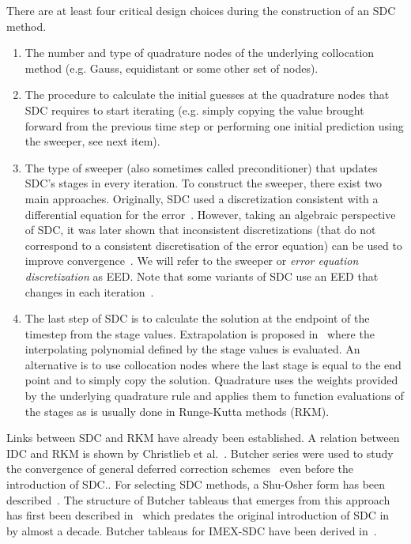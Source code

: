 \documentclass[sn-mathphys-num]{sn-jnl}%
\theoremstyle{thmstyleone}%
\theoremstyle{thmstyletwo}%
\theoremstyle{thmstylethree}%
\begin{document}
There are at least four critical design choices during the construction of an SDC method. 
\begin{enumerate}
 \item The number and type of quadrature nodes of the underlying collocation method (e.g. Gauss, equidistant or some other set of nodes).
 \item The procedure to calculate the initial guesses at the quadrature nodes that SDC requires to start iterating (e.g. simply copying the value brought forward from the previous time step or performing one initial prediction using the sweeper, see next item).
 \item The type of sweeper (also sometimes called preconditioner) that updates SDC's stages in every iteration.
To construct the sweeper, there exist two main approaches. 
Originally, SDC used a discretization consistent with a differential equation for the error~\citep{DuttEtAl2000,ChristliebEtAl2009}. 
However, taking an algebraic perspective of SDC, it was later shown that inconsistent discretizations (that do not correspond to a consistent discretisation of the error equation) can be used to improve convergence~\citep{Weiser2014}. We will refer to the sweeper or \emph{error equation discretization} as EED. Note that some variants of SDC use an EED that changes in each iteration~\citep{Weiser2014, CaklovicEtAl2025}.
\item The last step of SDC is to calculate the solution at the endpoint of the timestep from the stage values. 
Extrapolation is proposed in~\citep{DuttEtAl2000} where the interpolating polynomial defined by the stage values is evaluated. 
An alternative is to use collocation nodes where the last stage is equal to the end point and to simply copy the solution.
Quadrature uses the weights provided by the underlying quadrature rule and applies them to function evaluations of the stages as is usually done in Runge-Kutta methods (RKM).
\end{enumerate}

Links between SDC and RKM have already been established. 
A relation between IDC and RKM is shown by Christlieb et al.~\citep{ChristliebEtAl2009}.
Butcher series were used to study the convergence of general deferred correction schemes~\citep{HairerOID78} even before the introduction of SDC..
For selecting SDC methods, a Shu-Osher form has been described~\citep{Gottlieb2009,Gottlieb2011}. 
The structure of Butcher tableaus that emerges from this approach has first been described in~\citep{VanDerHouwen1991,Houwen1992,Houwen1993} which predates the original introduction of SDC in~\citep{DuttEtAl2000} by almost a decade. 
Butcher tableaus for IMEX-SDC have been derived in~\citep{BoscarinoEtAl2018}.
\end{document}
